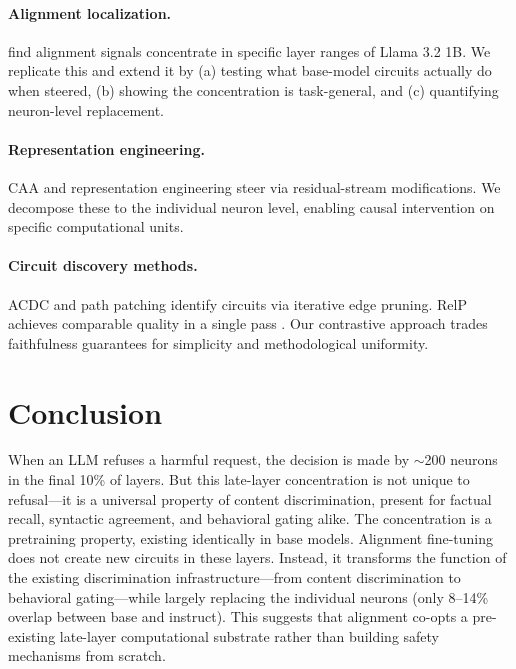 \documentclass{article}
\begin{document}
\paragraph{Alignment localization.}
\citet{chaudhury2025alignment} find alignment signals concentrate in specific layer ranges of Llama 3.2 1B.
We replicate this and extend it by (a) testing what base-model circuits actually do when steered, (b) showing the concentration is task-general, and (c) quantifying neuron-level replacement.

\paragraph{Representation engineering.}
CAA \citep{rimsky2024steering} and representation engineering \citep{zou2023representation} steer via residual-stream modifications.
We decompose these to the individual neuron level, enabling causal intervention on specific computational units.

\paragraph{Circuit discovery methods.}
ACDC \citep{conmy2023acdc} and path patching \citep{goldowskydill2023localizing} identify circuits via iterative edge pruning.
RelP achieves comparable quality in a single pass \citep{arora2025circuits,jafari2025relp}.
Our contrastive approach trades faithfulness guarantees for simplicity and methodological uniformity.

\section{Conclusion}
\label{sec:conclusion}

When an LLM refuses a harmful request, the decision is made by ${\sim}$200 neurons in the final 10\% of layers.
But this late-layer concentration is not unique to refusal---it is a universal property of content discrimination, present for factual recall, syntactic agreement, and behavioral gating alike.
The concentration is a pretraining property, existing identically in base models.
Alignment fine-tuning does not create new circuits in these layers.
Instead, it transforms the function of the existing discrimination infrastructure---from content discrimination to behavioral gating---while largely replacing the individual neurons (only 8--14\% overlap between base and instruct).
This suggests that alignment co-opts a pre-existing late-layer computational substrate rather than building safety mechanisms from scratch.
\end{document}
